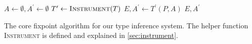 
\begin{algorithm}[htbp]
  \DontPrintSemicolon
  \BlankLine
  $A \gets \emptyset, A^{\prime} \gets \emptyset$ \;
  $T^{\prime} \gets \textsc{Instrument}(T)$ \;
  $E, A^{\prime} \gets T^{\prime}(P, A)$ \;
  \Return $E, A^{\prime}$ \;

  \caption{The core fixpoint algorithm for our type inference system.
    The helper function \textsc{Instrument} is defined and explained in \cref{sec:instrument}.}
  \label{alg:wpi-fixpoint}
\end{algorithm}
